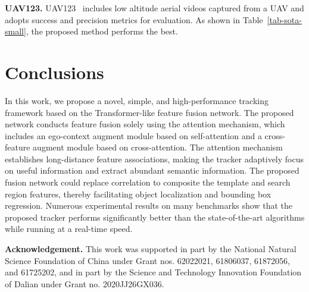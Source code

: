 \documentclass[final]{cvpr}
\begin{document}
\begin{table}[!t]
\caption{Comparison with state-of-the-art on the OTB100, NFS and UAV123 datasets in terms of overall AUC score. The best two results 
are shown in \textbf{\textcolor{red}{red}} and \textbf{\textcolor{blue}{blue}} fonts.}
\label{tab-sota-small}
\vspace{-6mm}
\begin{center}
\end{center}
\vspace{-7mm}
\end{table}

{\noindent \textbf{UAV123. }}UAV123~\cite{UAV} includes  low altitude aerial videos captured from a UAV and adopts success and precision metrics for evaluation.  
As shown in Table~\ref{tab-sota-small}, the proposed method performs the best.


\section{Conclusions}
In this work, we propose a novel, simple, and high-performance tracking framework based on the Transformer-like feature fusion network. 
The proposed network conducts feature fusion solely using the attention mechanism, which includes an ego-context augment module based on 
self-attention and a cross-feature augment module based on cross-attention. 
The attention mechanism establishes long-distance feature associations, making the tracker adaptively focus on useful information and extract abundant semantic information. 
The proposed fusion network could replace correlation to composite the template and search region features, thereby facilitating 
object localization and bounding box regression. 
Numerous experimental results on many benchmarks show that the proposed tracker performs significantly better than the state-of-the-art 
algorithms while running at a real-time speed. 

\vspace{3mm}

{\noindent \textbf{Acknowledgement.}} 
This work was supported in part by the
National Natural Science Foundation of China under Grant
nos. 62022021, 61806037, 61872056, and 61725202, and
in part by the Science and Technology Innovation Foundation of Dalian under Grant no. 2020JJ26GX036.

\clearpage
{\small


}
\end{document}
